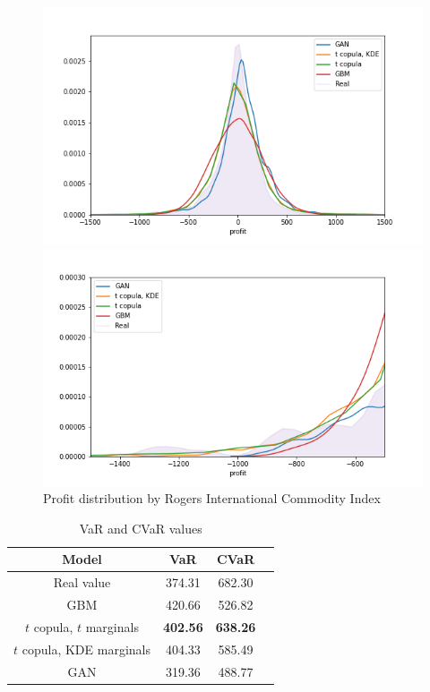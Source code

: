 \documentclass{article}
\begin{document}
\begin{figure}[ht!]
    \centering
    \begin{minipage}{.5\linewidth}
        \centering
        \includegraphics[width=\textwidth]{pics/hists.png}
    \end{minipage}%
    \begin{minipage}{.5\linewidth}
        \centering
        \includegraphics[width=\textwidth]{pics/tails.png}
    \end{minipage}%
    \caption{Profit distribution by Rogers International Commodity Index}
    \label{fig:profit}
\end{figure}

\begin{table}[ht!]
    \begin{center}
    \begin{tabular}{ |c|c|c|c| } 
    \hline
    Model & VaR & CVaR \\ 
    \hline
    Real value & 374.31 & 682.30 \\ 
    \hline
    GBM & 420.66 & 526.82 \\ 
    $t$ copula, $t$ marginals & \textbf{402.56} & \textbf{638.26} \\ 
    $t$ copula, KDE marginals & 404.33 & 585.49 \\ 
    GAN & 319.36 & 488.77 \\ 
    \hline
    \end{tabular}
    \end{center}
    \caption{VaR and CVaR values}
    \label{tab:var}
\end{table}
\end{document}
